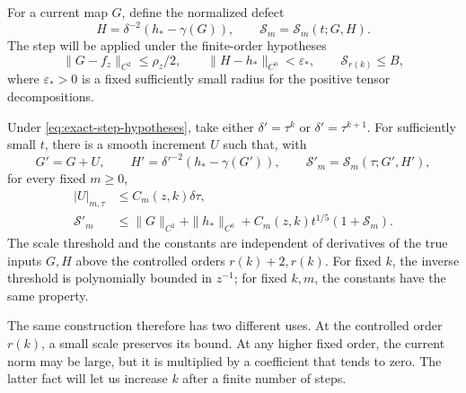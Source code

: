 For a current map $G$, define the normalized defect
\begin{equation}\label{eq:exact-normalized-defect}
 H=\delta^{-2}(h_*-\gamma(G)),\qquad
 \mathcal S_m=\mathcal S_m(t;G,H).
\end{equation}
The step will be applied under the finite-order hypotheses
\begin{equation}\label{eq:exact-step-hypotheses}
 \|G-f_z\|_{C^2}\le\rho_z/2,\qquad
 \|H-h_*\|_{C^0}<\varepsilon_*,\qquad
 \mathcal S_{r(k)}\le B,
\end{equation}
where $\varepsilon_*>0$ is a fixed sufficiently small radius for the
positive tensor decompositions.

\begin{lemma}\label{lem:exact-step}
Under \eqref{eq:exact-step-hypotheses}, take either
$\delta'=\tau^k$ or $\delta'=\tau^{k+1}$.  For sufficiently small
$t$, there is a smooth increment $U$ such that, with
\[
 G'=G+U,\qquad H'=\delta'^{-2}(h_*-\gamma(G')),
 \qquad \mathcal S'_m=\mathcal S_m(\tau;G',H'),
\]
for every fixed $m\ge0$,
\begin{align}
 |U|_{m,\tau}&\le C_m(z,k)\delta\tau,
 \label{eq:exact-increment-bound}\\
 \mathcal S'_m
 &\le \|G\|_{C^2}+\|h_*\|_{C^0}
       +C_m(z,k)t^{1/5}(1+\mathcal S_m).
 \label{eq:exact-all-order-recurrence}
\end{align}
The scale threshold and the constants are independent of derivatives
of the true inputs $G,H$ above the controlled orders $r(k)+2,r(k)$.
For fixed $k$, the inverse threshold is polynomially bounded in $z^{-1}$;
for fixed $k,m$, the constants have the same property.
\end{lemma}

The same construction therefore has two different uses.  At the controlled
order $r(k)$, a small scale preserves its bound.  At any higher fixed
order, the current norm may be large, but it is multiplied by a coefficient
that tends to zero.  The latter fact will let us increase $k$ after a
finite number of steps.

